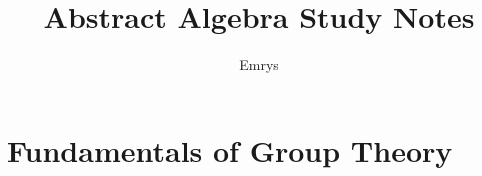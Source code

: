 \documentclass[12pt]{article}
\title{Abstract Algebra Study Notes}
\author{Emrys}
\date{}
\theoremstyle{oneline}
\theoremstyle{twoline}
\begin{document}
 
\maketitle
\tableofcontents
\newpage

\section{Fundamentals of Group Theory}
\end{document}
